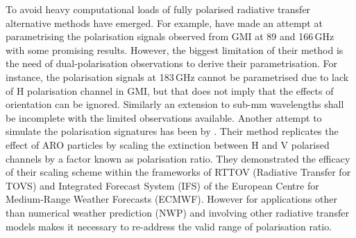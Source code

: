\documentclass[amt, manuscript]{copernicus}
\begin{document}
To avoid heavy computational loads of fully polarised radiative transfer alternative methods have emerged. For example,  \citet{galligani:param:21} have made an attempt at  parametrising the polarisation signals observed from GMI at 89 and 166\,GHz with some promising results. However, the biggest limitation of their method is the need of dual-polarisation observations to derive their parametrisation. For instance, the polarisation signals at 183\,GHz cannot be parametrised due to lack of H polarisation channel in GMI, but that does not imply that the effects of orientation can be ignored. Similarly an extension to sub-mm wavelengths shall be incomplete with the limited observations available. Another attempt to simulate the polarisation signatures has been by \citet{barlakas:intro:21}. Their method  replicates the effect of ARO particles by scaling the extinction between H and V polarised channels by a factor known as polarisation ratio. They demonstrated the efficacy of their scaling scheme within the frameworks of RTTOV (Radiative Transfer for TOVS) and Integrated Forecast System (IFS) of the European Centre for Medium-Range Weather Forecasts (ECMWF). However for applications other than numerical weather prediction (NWP) and involving other radiative transfer models makes it necessary to re-address the valid range of polarisation ratio. 

\end{document}
